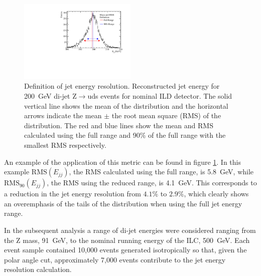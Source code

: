 \begin{figure}[h!]
\centering
\includegraphics[width=0.5\textwidth]{OptimisationStudies/Plots/MethodDescription/RMS90Plot.pdf}
\caption[Definition of jet energy resolution.   Reconstructed jet energy for 200~GeV di-jet Z$\rightarrow$uds events for nominal ILD detector.  The solid vertical line shows the mean of the distribution and the horizontal arrows indicate the mean $\pm$ the root mean square (RMS) of the distribution.  The red and blue lines represent the mean and RMS calculated using the full range and 90\% of the full range with the smallest RMS.]{Definition of jet energy resolution.   Reconstructed jet energy for 200~GeV di-jet Z$\rightarrow$uds events for nominal ILD detector.  The solid vertical line shows the mean of the distribution and the horizontal arrows indicate the mean $\pm$ the root mean square (RMS) of the distribution.  The red and blue lines show the mean and RMS calculated using the full range and 90\% of the full range with the smallest RMS respectively.}
\label{fig:rms90defintion}
\end{figure} 

An example of the application of this metric can be found in figure \ref{fig:rms90defintion}.  In this example $\text{RMS}(E_{jj})$, the RMS calculated using the full range, is 5.8~GeV, while $\text{RMS}_{90}(E_{jj})$, the RMS using the reduced range, is 4.1~GeV.  This corresponds to a reduction in the jet energy resolution from $4.1\%$ to $2.9\%$, which clearly shows an overemphasis of the tails of the distribution when using the full jet energy range.  

In the subsequent analysis a range of di-jet energies were considered ranging from the Z mass, 91~GeV, to the nominal running energy of the ILC, 500~GeV.  Each event sample contained 10,000 events generated isotropically so that, given the polar angle cut, approximately 7,000 events contribute to the jet energy resolution calculation. 


